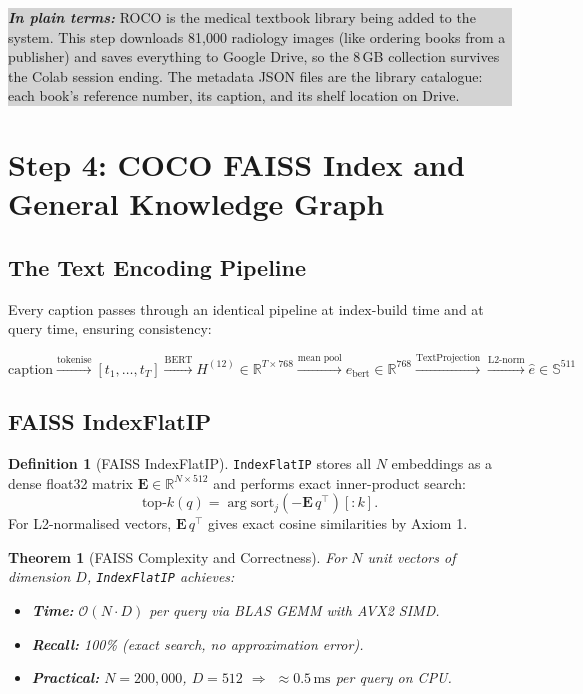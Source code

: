 \documentclass[12pt, a4paper]{article}
\theoremstyle{definition}
\newtheorem{definition}{Definition}[section]
\theoremstyle{plain}
\newtheorem{theorem}{Theorem}[section]
\theoremstyle{remark}
\newcommand{\R}{\mathbb{R}}
\newcommand{\Sphere}{\mathbb{S}}
\newcommand{\layman}[1]{%
  \vspace{4pt}%
  \noindent\colorbox{lightgray}{\parbox{\dimexpr\linewidth-2\fboxsep}{%
    \textbf{\textit{In plain terms:}} #1}}%
  \vspace{4pt}%
}
\begin{document}
\layman{ROCO is the medical textbook library being added to the system. This step downloads 81,000 radiology images (like ordering books from a publisher) and saves everything to Google Drive, so the 8\,GB collection survives the Colab session ending. The metadata JSON files are the library catalogue: each book's reference number, its caption, and its shelf location on Drive.}

\section{Step 4: COCO FAISS Index and General Knowledge Graph}
\label{sec:coco}

\subsection{The Text Encoding Pipeline}

Every caption passes through an identical pipeline at index-build time and at query time, ensuring consistency:

\[
\text{caption}
\xrightarrow{\text{tokenise}} [t_1,\ldots,t_T]
\xrightarrow{\text{BERT}} H^{(12)} \in \R^{T \times 768}
\xrightarrow{\text{mean pool}} e_{\text{bert}} \in \R^{768}
\xrightarrow{\text{TextProjection}} \xrightarrow{\text{L2-norm}}
\hat{e} \in \Sphere^{511}
\]

\subsection{FAISS IndexFlatIP}

\begin{definition}[FAISS IndexFlatIP]
\texttt{IndexFlatIP} stores all $N$ embeddings as a dense float32 matrix $\mathbf{E} \in \R^{N \times 512}$ and performs exact inner-product search:
\[
\text{top-}k(q) = \arg\text{sort}_{j}\!\left(-\mathbf{E}\,q^\top\right)[{:k}].
\]
For L2-normalised vectors, $\mathbf{E}\,q^\top$ gives exact cosine similarities by Axiom 1.
\end{definition}

\begin{theorem}[FAISS Complexity and Correctness]
For $N$ unit vectors of dimension $D$, \texttt{IndexFlatIP} achieves:
\begin{itemize}
  \item \textbf{Time:} $\mathcal{O}(N \cdot D)$ per query via BLAS GEMM with AVX2 SIMD.
  \item \textbf{Recall:} 100\% (exact search, no approximation error).
  \item \textbf{Practical:} $N=200{,}000$, $D=512$ $\Rightarrow$ $\approx 0.5\,\text{ms}$ per query on CPU.
\end{itemize}
\end{theorem}
\end{document}
